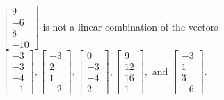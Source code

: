 \begin{exercise}
\begin{exerciseStatement}
  \end{exerciseStatement}
  \begin{exerciseAnswer}
   \(\left[\begin{array}{c}
9 \\
-6 \\
8 \\
-10
\end{array}\right]\) 
  	 is not  
	a linear combination of the vectors \(\left[\begin{array}{c}
-3 \\
-3 \\
-4 \\
-1
\end{array}\right] , \left[\begin{array}{c}
-3 \\
2 \\
1 \\
-2
\end{array}\right] , \left[\begin{array}{c}
0 \\
-3 \\
-4 \\
2
\end{array}\right] , \left[\begin{array}{c}
9 \\
12 \\
16 \\
1
\end{array}\right] , \text{ and } \left[\begin{array}{c}
-3 \\
1 \\
3 \\
-6
\end{array}\right]\).

	
  


  \end{exerciseAnswer}
\end{exercise}